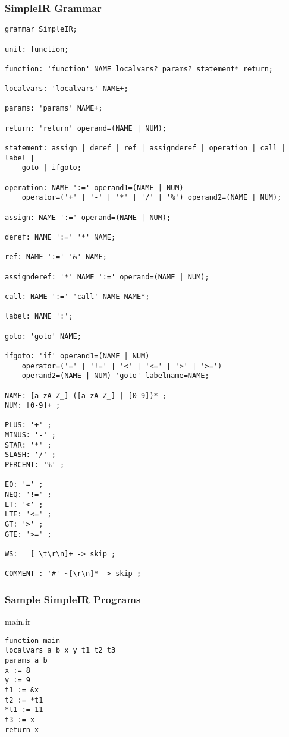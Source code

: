 \documentclass{article}
\begin{document}
\pagebreak

\subsubsection*{SimpleIR Grammar}

\begin{verbatim}
grammar SimpleIR;

unit: function;

function: 'function' NAME localvars? params? statement* return;

localvars: 'localvars' NAME+;

params: 'params' NAME+;

return: 'return' operand=(NAME | NUM);

statement: assign | deref | ref | assignderef | operation | call | label |
    goto | ifgoto;

operation: NAME ':=' operand1=(NAME | NUM)
    operator=('+' | '-' | '*' | '/' | '%') operand2=(NAME | NUM);

assign: NAME ':=' operand=(NAME | NUM);

deref: NAME ':=' '*' NAME;

ref: NAME ':=' '&' NAME;

assignderef: '*' NAME ':=' operand=(NAME | NUM);

call: NAME ':=' 'call' NAME NAME*;

label: NAME ':';

goto: 'goto' NAME;

ifgoto: 'if' operand1=(NAME | NUM)
    operator=('=' | '!=' | '<' | '<=' | '>' | '>=')
    operand2=(NAME | NUM) 'goto' labelname=NAME;

NAME: [a-zA-Z_] ([a-zA-Z_] | [0-9])* ;
NUM: [0-9]+ ;

PLUS: '+' ;
MINUS: '-' ;
STAR: '*' ;
SLASH: '/' ;
PERCENT: '%' ;

EQ: '=' ;
NEQ: '!=' ;
LT: '<' ;
LTE: '<=' ;
GT: '>' ;
GTE: '>=' ;

WS:   [ \t\r\n]+ -> skip ;

COMMENT : '#' ~[\r\n]* -> skip ;
\end{verbatim}

\pagebreak

\subsubsection*{Sample SimpleIR Programs}

main.ir
\begin{verbatim}
function main
localvars a b x y t1 t2 t3
params a b
x := 8
y := 9
t1 := &x
t2 := *t1
*t1 := 11
t3 := x
return x
\end{verbatim}
\end{document}

